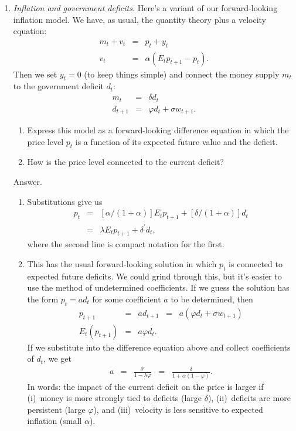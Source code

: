 \documentclass[11pt]{article}
\begin{document}
\begin{enumerate}
\item  {\it Inflation and government deficits.\/}
Here's a variant of our forward-looking inflation model.
We have, as usual, the quantity theory plus a velocity equation:
\begin{eqnarray*}
    m_t + v_t &=& p_t + y_t \\
    v_t &=& \alpha \left( E_t p_{t+1} - p_t \right) .
\end{eqnarray*}
Then we set $y_t = 0$ (to keep things simple) and connect the money supply $m_t$
to the government deficit $d_t$:
\begin{eqnarray*}
        m_{t} &=& \delta d_t \\
        d_{t+1} &=& \varphi d_t + \sigma w_{t+1} .
\end{eqnarray*}
%
\begin{enumerate}
\item Express this model as a forward-looking difference equation in
which the price level $p_t$ is a function of its expected future value
and the deficit.
\item How is the price level connected to the current deficit?
\end{enumerate}
%
Answer.
\begin{enumerate}
\item Substitutions give us
\begin{eqnarray*}
    p_t &=& [\alpha/(1+\alpha)] E_t p_{t+1} + [\delta/(1+\alpha)] d_t \\
        &=& \lambda E_t p_{t+1} + \delta^\prime d_t ,
\end{eqnarray*}
where the second line is compact notation for the first.
\item This has the usual forward-looking solution in which $p_t$
is connected to expected future deficits.
We could grind through this, but it's easier to use the method of undetermined
coefficients.
If we guess the solution has the form $ p_t = a d_t$ for some coefficient $a$ to be determined,
then
\begin{eqnarray*}
    p_{t+1} &=& a d_{t+1} \;\;=\;\; a (\varphi d_t + \sigma w_{t+1}) \\
   E_t (  p_{t+1})  &=&  a \varphi d_t .
\end{eqnarray*}
If we substitute into the difference equation above and collect coefficients
of $d_t$, we get
\begin{eqnarray*}
    a &=& \frac{\delta'}{1-\lambda \varphi}  \;\;=\;\; \frac{\delta}{1+\alpha(1-\varphi)} .
\end{eqnarray*}
In words:  the impact of the current deficit on the price is larger if
(i)~money is more strongly tied to deficits (large $\delta$),
(ii)~deficits are more persistent (large $\varphi$),
and (iii)~velocity is less sensitive to expected inflation (small $\alpha$).
\end{enumerate}


\end{enumerate}



\end{document}
